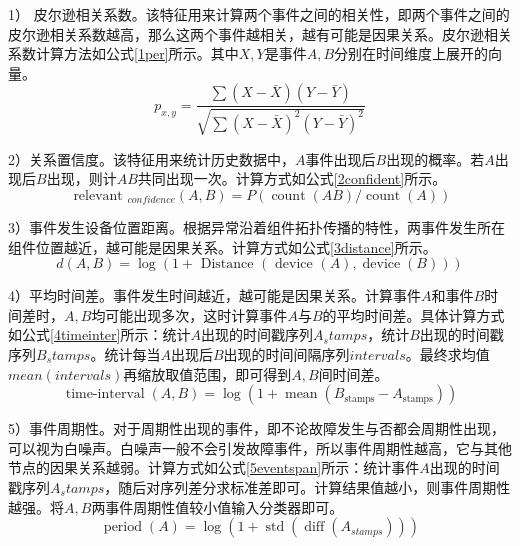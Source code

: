 1） 皮尔逊相关系数。该特征用来计算两个事件之间的相关性，即两个事件之间的皮尔逊相关系数越高，那么这两个事件越相关，越有可能是因果关系。皮尔逊相关系数计算方法如公式\ref{1per}所示。其中$X,Y$是事件$A,B$分别在时间维度上展开的向量。
\begin{equation}
    p_{x, y}=\frac{\sum(X-\bar{X})(Y-\bar{Y})}{\sqrt{\sum(X-\bar{X})^{2}(Y-\bar{Y})^{2}}}\label{1per}
\end{equation}

2）关系置信度。该特征用来统计历史数据中，$A$事件出现后$B$出现的概率。若$A$出现后$B$出现，则计$AB$共同出现一次。计算方式如公式\ref{2confident}所示。
\begin{equation}
    \text { relevant }_{confidence }(A, B)=P(\operatorname{count}(A B) / \operatorname{count}(A))\label{2confident}
\end{equation}

3）事件发生设备位置距离。根据异常沿着组件拓扑传播的特性，两事件发生所在组件位置越近，越可能是因果关系。计算方式如公式\ref{3distance}所示。
\begin{equation}
    d(A, B)=\log (1+\text { Distance }(\text { device }(A), \operatorname{device}(B)))\label{3distance}
\end{equation}

4）平均时间差。事件发生时间越近，越可能是因果关系。计算事件$A$和事件$B$时间差时，$A,B$均可能出现多次，这时计算事件$A$与$B$的平均时间差。具体计算方式如公式\ref{4timeinter}所示：统计$A$出现的时间戳序列$A_stamps$，统计$B$出现的时间戳序列$B_stamps$。统计每当$A$出现后$B$出现的时间间隔序列$intervals$。最终求均值$mean(intervals)$再缩放取值范围，即可得到$A,B$间时间差。
\begin{equation}
    \operatorname{\text{time-interval}}\left ( A,B \right ) =  \log\left ({1+  \operatorname{mean} \left ( B_\text{stamps} - A_\text{stamps} \right ) } \right )\label{4timeinter}
\end{equation}

5）事件周期性。对于周期性出现的事件，即不论故障发生与否都会周期性出现，可以视为白噪声。白噪声一般不会引发故障事件，所以事件周期性越高，它与其他节点的因果关系越弱。计算方式如公式\ref{5eventspan}所示：统计事件$A$出现的时间戳序列$A_stamps$，随后对序列差分求标准差即可。计算结果值越小，则事件周期性越强。将$A,B$两事件周期性值较小值输入分类器即可。
\begin{equation}
    \operatorname{period}(A)=\log \left(1+\operatorname{std}\left(\operatorname{diff}\left(A_{stamps}\right)\right)\right)\label{5eventspan}
\end{equation}

